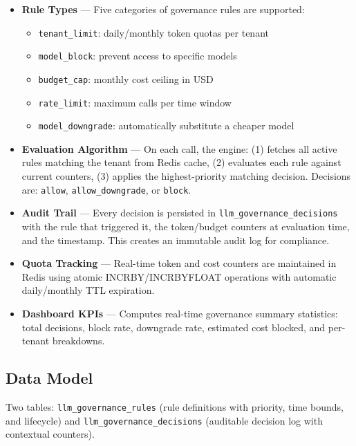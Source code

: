 \documentclass[12pt,a4paper,twoside]{report}
\begin{document}
\begin{itemize}
  \item \textbf{Rule Types} — Five categories of governance rules are supported:
    \begin{itemize}
      \item \texttt{tenant\_limit}: daily/monthly token quotas per tenant
      \item \texttt{model\_block}: prevent access to specific models
      \item \texttt{budget\_cap}: monthly cost ceiling in USD
      \item \texttt{rate\_limit}: maximum calls per time window
      \item \texttt{model\_downgrade}: automatically substitute a cheaper model
    \end{itemize}

  \item \textbf{Evaluation Algorithm} — On each call, the engine: (1) fetches all active rules matching the tenant from Redis cache, (2) evaluates each rule against current counters, (3) applies the highest-priority matching decision. Decisions are: \texttt{allow}, \texttt{allow\_downgrade}, or \texttt{block}.

  \item \textbf{Audit Trail} — Every decision is persisted in \texttt{llm\_governance\_decisions} with the rule that triggered it, the token/budget counters at evaluation time, and the timestamp. This creates an immutable audit log for compliance.

  \item \textbf{Quota Tracking} — Real-time token and cost counters are maintained in Redis using atomic INCRBY/INCRBYFLOAT operations with automatic daily/monthly TTL expiration.

  \item \textbf{Dashboard KPIs} — Computes real-time governance summary statistics: total decisions, block rate, downgrade rate, estimated cost blocked, and per-tenant breakdowns.
\end{itemize}

\subsection{Data Model}
Two tables: \texttt{llm\_governance\_rules} (rule definitions with priority, time bounds, and lifecycle) and \texttt{llm\_governance\_decisions} (auditable decision log with contextual counters).
\end{document}
